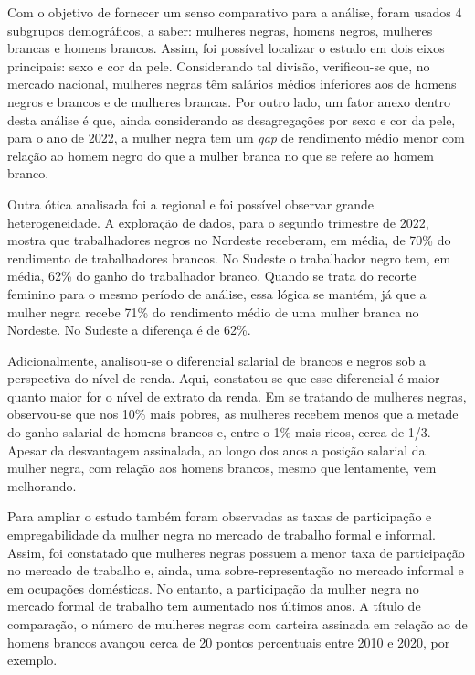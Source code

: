 \documentclass[12pt]{article}
\begin{document}
\par Com o objetivo de fornecer um senso comparativo para a análise, foram usados 4 subgrupos demográficos, a saber: mulheres negras, homens negros, mulheres brancas e homens brancos. Assim, foi possível localizar o estudo em dois eixos principais: sexo e cor da pele. Considerando tal divisão, verificou-se que, no mercado nacional, mulheres negras têm salários médios inferiores aos de homens negros e brancos e de mulheres brancas. Por outro lado, um fator anexo dentro desta análise é que, ainda considerando as desagregações por sexo e cor da pele, para o ano de 2022, a mulher negra tem um \textit{gap} de rendimento médio menor com relação ao homem negro do que a mulher branca no que se refere ao homem branco. 

\par Outra ótica analisada foi a regional e foi possível observar grande heterogeneidade. A exploração de dados, para o segundo trimestre de 2022, mostra que trabalhadores negros no Nordeste receberam, em média, de 70\% do rendimento de trabalhadores brancos. No Sudeste o trabalhador negro tem, em média, 62\% do ganho do trabalhador branco. Quando se trata do recorte feminino para o mesmo período de análise, essa lógica se mantém, já que a mulher negra recebe 71\% do rendimento médio de uma mulher branca no Nordeste. No Sudeste a diferença é de 62\%.

\par Adicionalmente, analisou-se o diferencial salarial de brancos e negros sob a perspectiva do nível de renda. Aqui, constatou-se que esse diferencial é maior quanto maior for o nível de extrato da renda. Em se tratando de mulheres negras, observou-se que nos 10\% mais pobres, as mulheres recebem menos que a metade do ganho salarial de homens brancos e, entre o 1\% mais ricos, cerca de 1/3. Apesar da desvantagem assinalada, ao longo dos anos a posição salarial da mulher negra, com relação aos homens brancos, mesmo que lentamente, vem melhorando.

\par Para ampliar o estudo também foram observadas as taxas de participação e empregabilidade da mulher negra no mercado de trabalho formal e informal. Assim, foi constatado que mulheres negras possuem a menor taxa de participação no mercado de trabalho e, ainda, uma sobre-representação no mercado informal e em ocupações domésticas. No entanto, a participação da mulher negra no mercado formal de trabalho tem aumentado nos últimos anos. A título de comparação, o número de mulheres negras com carteira assinada em relação ao de homens brancos avançou cerca de 20 pontos percentuais entre 2010 e 2020, por exemplo.
\end{document}
